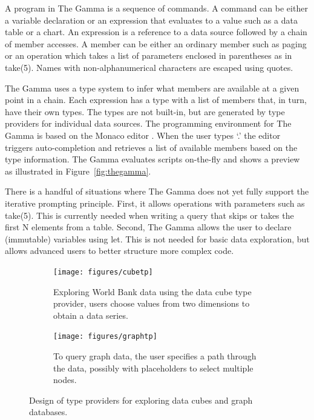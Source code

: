 \documentclass[manuscript,review,anonymous]{acmart}
\newcommand{\ikvd}[1]{{\fontfamily{zi4}\selectfont\small #1}}
\begin{document}
A program in The Gamma is a sequence of commands. A command can be either a variable declaration
or an expression that evaluates to a value such as a data table or a chart.
An expression is a reference to a data source followed by a chain of member accesses.
A member can be either an ordinary member such as \ikvd{paging} or an operation which takes a
list of parameters enclosed in parentheses as in \ikvd{take(5)}.
Names with non-alphanumerical characters are escaped using quotes.

The Gamma uses a type system to infer what members are available at a given point in a chain.
Each expression has a type with a list of members that, in turn, have their own types.
The types are not built-in, but are generated by type providers for individual data sources.
The programming environment for The Gamma is based on the Monaco editor \cite{monaco}. When the user types `.'
the editor triggers auto-completion and retrieves a list of available members based on the type
information. The Gamma evaluates scripts on-the-fly and shows a preview as
illustrated in Figure~\ref{fig:thegamma}.

There is a handful of situations where The Gamma does not yet fully support the iterative prompting
principle. First, it allows operations with parameters such as \ikvd{take(5)}. This is currently
needed when writing a query that skips or takes the first N elements from a table. Second,
The Gamma allows the user to declare (immutable) variables using \ikvd{let}. This is not needed
for basic data exploration, but allows advanced users to better structure more complex code.

\begin{figure}
\centering
\begin{subfigure}[b]{0.5\textwidth}
  \centering
  \texttt{[image: figures/cubetp]}
  \vspace{0.5em}
  \caption{Exploring World Bank data using the data cube type provider, users
    choose values from two dimensions to obtain a data series.}
  \label{fig:cubetp}
\end{subfigure}
\hfill
\begin{subfigure}[b]{0.45\textwidth}
  \centering
  \texttt{[image: figures/graphtp]}
  \caption{To query graph data, the user specifies a path through the data, possibly with
    placeholders to select multiple nodes.}
  \label{fig:graphtp}
\end{subfigure}
\vspace{-0.5em}
\caption{Design of type providers for exploring data cubes and graph databases.}
\label{fig:tps}
\end{figure}
\end{document}
